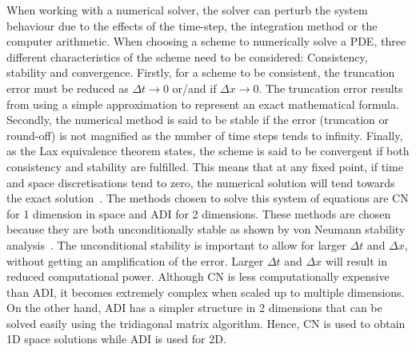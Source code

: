 When working with a numerical solver, the solver can perturb the system behaviour due to the effects of the time-step, the integration method or the computer arithmetic.
When choosing a scheme to numerically solve a PDE, three different characteristics of the scheme need to be considered: Consistency, stability and convergence.
Firstly, for a scheme to be consistent, the truncation error must be reduced as $\Delta t \rightarrow 0$ or/and if $\Delta x \rightarrow 0$.
The truncation error results from using a simple approximation to represent an exact mathematical formula.
Secondly, the numerical method is said to be stable if the error (truncation or round-off) is not magnified as the number of time steps tends to infinity.
Finally, as the Lax equivalence theorem states, the scheme is said to be convergent if both consistency and stability are fulfilled.
This means that at any fixed point, if time and space discretisations tend to zero, the numerical solution will tend towards the exact solution~\parencite{smith1985numerical}.
The methods chosen to solve this system of equations are \acrfull{CN} for 1 dimension in space and \acrfull{ADI} for 2 dimensions. These methods are chosen because they are both unconditionally stable as shown by von Neumann stability analysis~\parencite{strikwerda2004finite}. The unconditional stability is important to allow for larger $\Delta t$ and $\Delta x$, without getting an amplification of the error. Larger $\Delta t$ and $\Delta x$ will result in reduced computational power. Although \acrshort{CN} is less computationally expensive than \acrshort{ADI}, it becomes extremely complex when scaled up to multiple dimensions. On the other hand, \acrshort{ADI} has a simpler structure in 2 dimensions that can be solved easily using the tridiagonal matrix algorithm. Hence, \acrshort{CN} is used to obtain 1D space solutions while \acrshort{ADI} is used for 2D.
